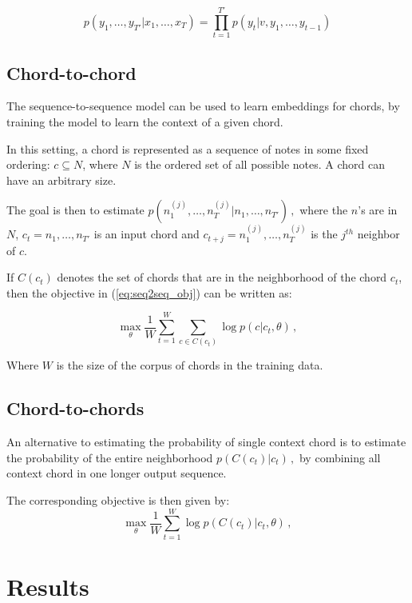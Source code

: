\documentclass[12pt]{article}\pagestyle{myheadings}
\begin{document}
\begin{equation}
p(y_1,\ldots,y_{T'} | x_1, \ldots, x_T) = \prod_{t=1}^{T'} p(y_t|v, y_1,\ldots,y_{t-1})
\end{equation}

\subsection{Chord-to-chord}
The sequence-to-sequence model can be used to learn embeddings for chords, by training the model to learn the context of a given chord. 

In this setting, a chord is represented as a sequence of notes in some fixed ordering: $c \subseteq N$, where $N$ is the ordered set of all possible notes. A chord can have an arbitrary size. 

The goal is then to estimate
$
p(n^{(j)}_1, \ldots, n^{(j)}_T | n_1,\ldots,n_{T'})\,,
$
where the $n$'s are in $N$, $ c_t=n_1,\ldots,n_{T'}$ is an input chord and $c_{t+j} =n^{(j)}_1, \ldots, n^{(j)}_T$ is the $j^{th}$ neighbor of $c$.

If $C(c_t)$ denotes the set of chords that are in the neighborhood of the chord $c_t$, then the objective in (\ref{eq:seq2seq_obj}) can be written as:

\begin{equation}
\max_{\theta}  \frac{1}{W} \sum_{t=1}^{W} \sum_{c\in C(c_t)} \log p(c|c_t,\theta)\,,
\label{eq:c2c_obj}
\end{equation}

Where $W$ is the size of the corpus of chords in the training data. 


\subsection{Chord-to-chords}
An alternative to estimating the probability of single context chord is to estimate the probability of the entire neighborhood 
$
p(C(c_t) | c_t)\,,
$
by combining all context chord in one longer output sequence. 

The corresponding objective is then given by:
\begin{equation}
\max_{\theta}  \frac{1}{W} \sum_{t=1}^{W} \log p(C(c_t)|c_t,\theta)\,,
\label{eq:c2cs_obj}
\end{equation}

\section{Results}
\end{document}
